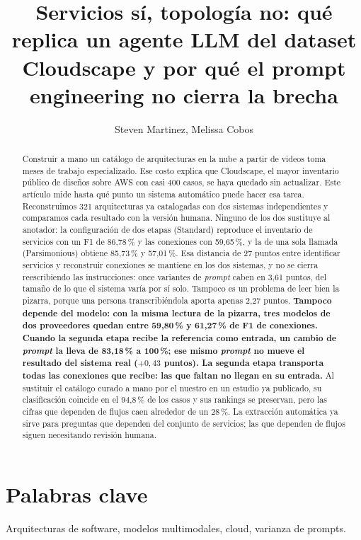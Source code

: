 \documentclass[a4paper, twocolumn, 10pt]{IEEEtran}
\title{Servicios sí, topología no: qué replica un agente LLM del dataset Cloudscape y por qué el prompt engineering no cierra la brecha}
\author{Steven Martinez, Melissa Cobos}
\newcommand{\nuevo}[1]{{\bfseries #1}}
\begin{document}
\maketitle
 
\begin{abstract}
Construir a mano un catálogo de arquitecturas en la nube a partir de videos toma
meses de trabajo especializado. Ese costo explica que Cloudscape, el mayor
inventario público de diseños sobre AWS con casi 400 casos, se haya quedado sin
actualizar. Este artículo mide hasta qué punto un sistema automático puede hacer
esa tarea. Reconstruimos 321 arquitecturas ya catalogadas con dos sistemas
independientes y comparamos cada resultado con la versión humana. Ninguno de los
dos sustituye al anotador: la configuración de dos etapas (Standard) reproduce el
inventario de servicios con un F1 de 86,78\,\% y las conexiones con 59,65\,\%, y
la de una sola llamada (Parsimonious) obtiene 85,73\,\% y 57,01\,\%. Esa distancia
de 27 puntos entre identificar servicios y reconstruir conexiones se mantiene en
los dos sistemas, y no se cierra reescribiendo las instrucciones: once variantes
de \emph{prompt} caben en 3,61 puntos, del tamaño de lo que el sistema varía por
sí solo. Tampoco es un problema de leer bien la pizarra, porque una persona
transcribiéndola aporta apenas 2,27 puntos. \nuevo{Tampoco depende del modelo: con
la misma lectura de la pizarra, tres modelos de dos proveedores quedan entre
59,80\,\% y 61,27\,\% de F1 de conexiones. Cuando la segunda etapa recibe la
referencia como entrada, un cambio de \emph{prompt} la lleva de 83,18\,\% a
100\,\%; ese mismo \emph{prompt} no mueve el resultado del sistema real
($+0{,}43$ puntos). La segunda etapa transporta todas las conexiones que recibe:
las que faltan no llegan en su entrada.} Al sustituir el catálogo curado a
mano por el nuestro en un estudio ya publicado, su clasificación coincide en el
94,8\,\% de los casos y sus rankings se preservan, pero las cifras que dependen de
flujos caen alrededor de un 28\,\%. La extracción automática ya sirve para
preguntas que dependen del conjunto de servicios; las que dependen de flujos
siguen necesitando revisión humana.
\end{abstract}
 
\section*{Palabras clave}
Arquitecturas de software, modelos multimodales, cloud, varianza de prompts.
 
\end{document}
